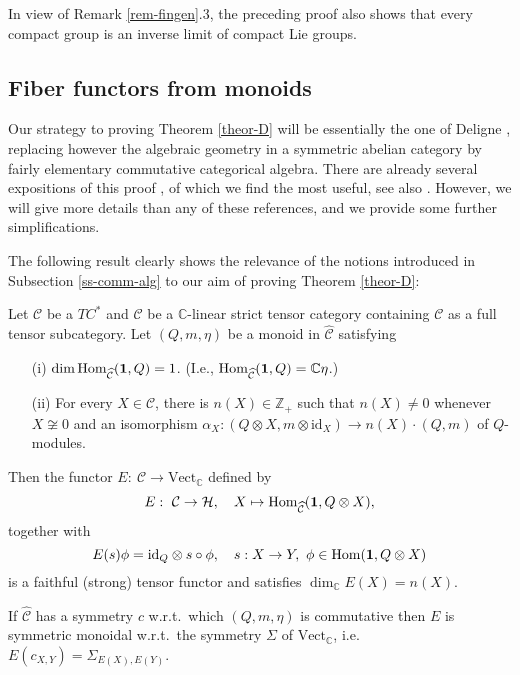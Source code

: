 \documentclass[12pt]{article}
\theoremstyle{definition}
\theoremstyle{definition}
\theoremstyle{remark}
\newcommand{\Vect}{\mathrm{Vect}}
\def\2#1{{\mathcal #1}}
\def\7#1{{\mathbb #1}}
\def\1#1{{\bf #1}}
\newcommand{\Hom}{\mathrm{Hom}}
\newcommand{\mcirc}{\circ}
\newcommand{\rarr}{\rightarrow}
\def\id{\mathrm{id}}
\begin{document}
\brem In view of Remark \ref{rem-fingen}.3, the preceding proof also
shows that every compact group is an inverse limit of compact Lie
groups.  \erem





\subsection{Fiber functors from monoids} \label{ss-monoid1}
 Our strategy to proving Theorem \ref{theor-D} will be
essentially the one of Deligne \cite{del}, replacing however the
algebraic geometry in a symmetric abelian category by fairly
elementary commutative categorical algebra. There are already several
expositions of this proof \cite{bichon,rosenb,phh}, of which we find
\cite{bichon} the most useful, see also \cite{bichon1}. However, we
will give more details than any of these references, and we provide
some further simplifications.

The following result clearly shows the relevance of the notions introduced in Subsection
\ref{ss-comm-alg} to our aim of proving Theorem \ref{theor-D}:

\bprop \label{prop-embed}  
Let $\2C$ be a $TC^*$ and $\widehat{\2C}$ be a $\7C$-linear strict tensor category containing $\2C$
as a full tensor subcategory. Let $(Q,m,\eta)$ be a monoid in $\widehat{\2C}$ satisfying
\begin{itemize}
\item[(i)] $\dim\Hom_{\widehat{\2C}}(\11,Q)=1$. (I.e., $\Hom_{\widehat{\2C}}(\11,Q)=\7C\eta$.)
\item[(ii)] For every $X\in\2C$, there is $n(X)\in\7Z_+$ such that $n(X)\ne 0$ whenever 
$X\not\cong 0$ and an isomorphism $\alpha_X:(Q\otimes X,m\otimes\id_X)\rarr n(X)\cdot(Q,m)$ of
$Q$-modules. 
\end{itemize}
Then the functor $E: \ \2C\rarr \Vect_\7C$ defined by 
\[ E: \ \2C\rarr\2H, \quad X\mapsto \Hom_{\widehat{\2C}}(\11,Q\otimes
X), \] together with
\begin{equation} \label{e-Emor}
E(s)\phi=\id_Q\otimes s\mcirc  \phi, \quad s:X\rarr Y,\ \phi\in\Hom(\11,Q\otimes X) 
\end{equation}
is a faithful (strong) tensor functor and satisfies $\dim_\7C E(X)=n(X)$.

If $\widehat{\2C}$ has a symmetry $c$ w.r.t.\ which $(Q,m,\eta)$ is
commutative then $E$ is symmetric monoidal w.r.t.\ the symmetry
$\Sigma$ of $\Vect_\7C$, i.e.\ $E(c_{X,Y})=\Sigma_{E(X),E(Y)}$.
\eprop
\end{document}
